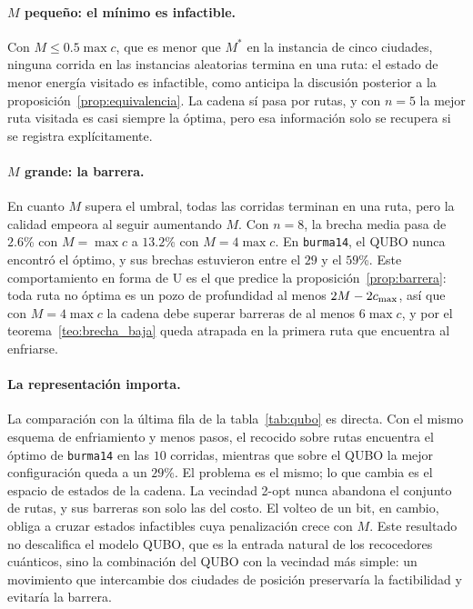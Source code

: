 \paragraph{\(M\) pequeño: el mínimo es infactible.} Con
\(M\le0.5\max c\), que es menor que \(M^\ast\) en la instancia de
cinco ciudades, ninguna corrida en las instancias aleatorias termina en
una ruta: el estado de menor energía visitado es infactible, como
anticipa la discusión posterior a la
proposición~\ref{prop:equivalencia}. La cadena sí pasa por rutas, y
con \(n=5\) la mejor ruta visitada es casi siempre la óptima, pero esa
información solo se recupera si se registra explícitamente.

\paragraph{\(M\) grande: la barrera.} En cuanto \(M\) supera el umbral,
todas las corridas terminan en una ruta, pero la calidad empeora al
seguir aumentando \(M\). Con \(n=8\), la brecha media pasa de
\(2.6\)\% con \(M=\max c\) a \(13.2\)\% con \(M=4\max c\). En
\texttt{burma14}, el QUBO nunca encontró el óptimo, y sus brechas
estuvieron entre el \(29\) y el \(59\)\%. Este comportamiento en
forma de U es el que predice la proposición~\ref{prop:barrera}: toda
ruta no óptima es un pozo de profundidad al menos \(2M-2c_{\max}\), así
que con \(M=4\max c\) la cadena debe superar barreras de al menos
\(6\max c\), y por el teorema~\ref{teo:brecha_baja} queda atrapada en
la primera ruta que encuentra al enfriarse.

\paragraph{La representación importa.} La comparación con la última
fila de la tabla~\ref{tab:qubo} es directa. Con el mismo esquema de
enfriamiento y menos pasos, el recocido sobre rutas encuentra el óptimo
de \texttt{burma14} en las \(10\) corridas, mientras que sobre el QUBO
la mejor configuración queda a un \(29\)\%. El problema es el mismo; lo
que cambia es el espacio de estados de la cadena. La vecindad 2-opt
nunca abandona el conjunto de rutas, y sus barreras son solo las del
costo. El volteo de un bit, en cambio, obliga a cruzar estados
infactibles cuya penalización crece con \(M\). Este resultado no
descalifica el modelo QUBO, que es la entrada natural de los
recocedores cuánticos, sino la combinación del QUBO con la vecindad
más simple: un movimiento que intercambie dos ciudades de posición
preservaría la factibilidad y evitaría la barrera.
